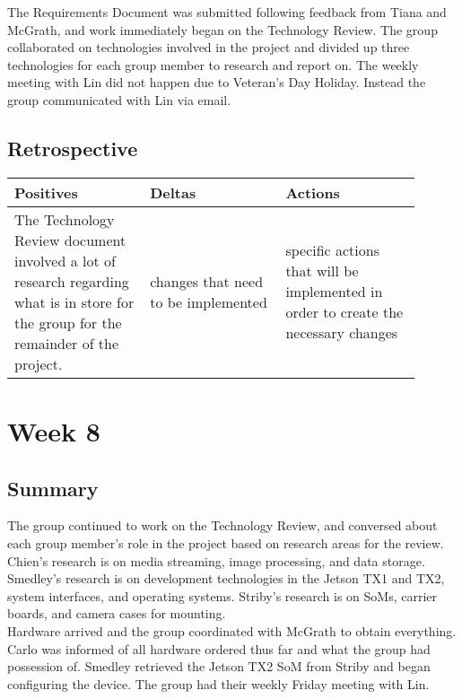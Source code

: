 \documentclass[letterpaper,10pt,serif,draftclsnofoot,onecolumn,compsoc,titlepage]{IEEEtran}
\begin{document}
The Requirements Document was submitted following feedback from Tiana and McGrath, 
and work immediately began on the Technology Review. The group collaborated on 
technologies involved in the project and divided up three technologies for each 
group member to research and report on. The weekly meeting with Lin did not happen 
due to Veteran's Day Holiday. Instead the group communicated with Lin via email. \\

\subsection{Retrospective}

\begin{tabular}{|p{0.3\linewidth}|p{0.3\linewidth}|p{0.3\linewidth}|}
   \hline
   \textbf{Positives} & \textbf{Deltas} & \textbf{Actions}\\ 
   \hline
   The Technology Review document involved a lot of research regarding what is in 
   store for the group for the remainder of the project.  
   & 
   changes that need to be implemented 
   & 
   specific actions that will be implemented in order to create the necessary 
   changes \\
   \hline
\end{tabular}

\section{Week 8}

\subsection{Summary}

The group continued to work on the Technology Review, and conversed about each group 
member's role in the project based on research areas for the review. Chien's research 
is on media streaming, image processing, and data storage. Smedley's research is on 
development technologies in the Jetson TX1 and TX2, system interfaces, and operating 
systems. Striby's research is on SoMs, carrier boards, and camera cases for mounting. \\

Hardware arrived and the group coordinated with McGrath to obtain everything. Carlo was 
informed of all hardware ordered thus far and what the group had possession of. Smedley 
retrieved the Jetson TX2 SoM from Striby and began configuring the device. The group 
had their weekly Friday meeting with Lin.\\
\end{document}
